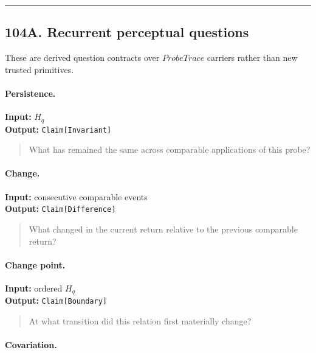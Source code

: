 \documentclass[
]{article}
\begin{document}
\begin{center}\rule{0.5\linewidth}{0.5pt}\end{center}


\subsection{104A. Recurrent perceptual questions}\label{recurrent-perceptual-questions}

These are derived question contracts over \(ProbeTrace\) carriers rather than new
trusted primitives.

\paragraph{Persistence.}

\textbf{Input:} \(H_q\)\\
\textbf{Output:} \texttt{Claim[Invariant]}

\begin{quote}
What has remained the same across comparable applications of this probe?
\end{quote}

\paragraph{Change.}

\textbf{Input:} consecutive comparable events\\
\textbf{Output:} \texttt{Claim[Difference]}

\begin{quote}
What changed in the current return relative to the previous comparable return?
\end{quote}

\paragraph{Change point.}

\textbf{Input:} ordered \(H_q\)\\
\textbf{Output:} \texttt{Claim[Boundary]}

\begin{quote}
At what transition did this relation first materially change?
\end{quote}

\paragraph{Covariation.}
\end{document}
